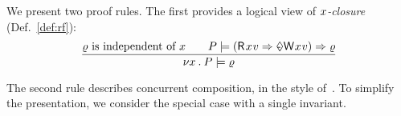 


We present two proof rules. 
The first provides a logical view of \emph{$x$-closure} (Def.~\ref{def:rf}):
\begin{displaymath}
  \frac{
    \afo \text{ is independent of } \aLoc
    \qquad
    \aPS \models (\DR{\aLoc}{\aVal} \Rightarrow \once \DW{\aLoc}{\aVal}) \Rightarrow \afo
  }{
    \nu \aLoc \DOT \aPS \models \afo
  }
\end{displaymath}

The second rule describes concurrent composition, in the style of~\citet{Abadi:1993:CS:151646.151649}.  To simplify the presentation, we
consider the special case with a single invariant.

